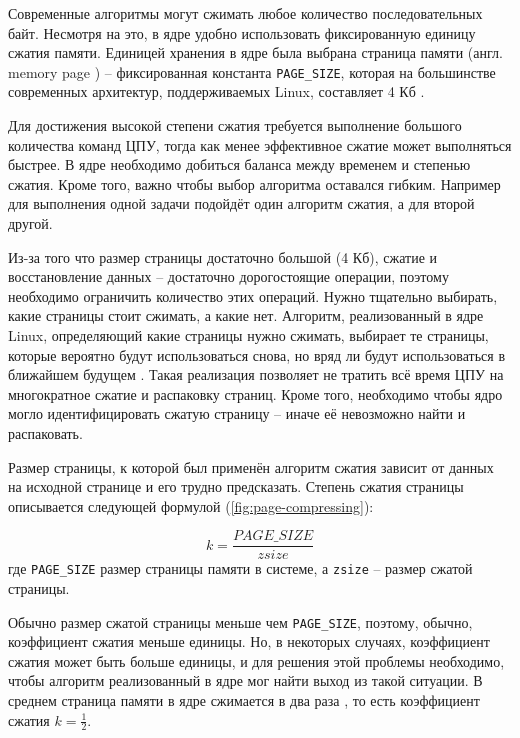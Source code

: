 Современные алгоритмы могут сжимать любое количество последовательных байт. Несмотря на это, в ядре удобно использовать фиксированную единицу сжатия памяти. Единицей хранения в ядре была выбрана страница памяти (англ. memory page \cite{memory-page}) -- фиксированная константа \texttt{PAGE\_SIZE}, которая на большинстве современных архитектур, поддерживаемых Linux, составляет 4 Кб \cite{4kb-page-size}.

Для достижения высокой степени сжатия требуется выполнение большого количества команд ЦПУ, тогда как менее эффективное сжатие может выполняться быстрее. В ядре необходимо добиться баланса между временем и степенью сжатия. Кроме того, важно чтобы выбор алгоритма оставался гибким. Например для выполнения одной задачи подойдёт один алгоритм сжатия, а для второй другой.

Из-за того что размер страницы достаточно большой (4 Кб), сжатие и восстановление данных -- достаточно дорогостоящие операции, поэтому необходимо ограничить количество этих операций. Нужно тщательно выбирать, какие страницы стоит сжимать, а какие нет. Алгоритм, реализованный в ядре Linux, определяющий какие страницы нужно сжимать, выбирает те страницы, которые вероятно будут использоваться снова, но вряд ли будут использоваться в ближайшем будущем \cite{in-kernel-memory-compression}. Такая реализация позволяет не тратить всё время ЦПУ на многократное сжатие и распаковку страниц. Кроме того, необходимо чтобы ядро могло идентифицировать сжатую страницу -- иначе её невозможно найти и распаковать.

Размер страницы, к которой был применён алгоритм сжатия зависит от данных на исходной странице и его трудно предсказать. Степень сжатия страницы описывается следующей формулой (\ref{fig:page-compressing}):

\begin{equation}\label{fig:page-compressing}
	k = \frac{PAGE\_SIZE}{zsize}
\end{equation}
где \texttt{PAGE\_SIZE} размер страницы памяти в системе, а \texttt{zsize} -- размер сжатой страницы. 

Обычно размер сжатой страницы меньше чем \texttt{PAGE\_SIZE}, поэтому, обычно, коэффициент сжатия меньше единицы. Но, в некоторых случаях, коэффициент сжатия может быть больше единицы, и для решения этой проблемы необходимо, чтобы алгоритм реализованный в ядре мог найти выход из такой ситуации. В среднем страница памяти в ядре сжимается в два раза \cite{in-kernel-memory-compression}, то есть коэффициент сжатия $ k =\frac{1}{2}$.

